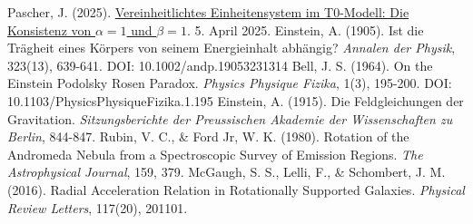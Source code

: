 \documentclass[12pt,a4paper]{article}
\begin{document}
\begin{thebibliography}{99}
		 Pascher, J. (2025). \href{https://github.com/jpascher/T0-Time-Mass-Duality/tree/main/2/pdf/Deutsch/Die Konsistenz von alpha = 1 und beta = 1.pdf}{Vereinheitlichtes Einheitensystem im T0-Modell: Die Konsistenz von \(\alpha = 1\) und \(\beta = 1\)}. 5. April 2025.
		 Einstein, A. (1905). Ist die Trägheit eines Körpers von seinem Energieinhalt abhängig? \textit{Annalen der Physik}, 323(13), 639-641. DOI: 10.1002/andp.19053231314
		 Bell, J. S. (1964). On the Einstein Podolsky Rosen Paradox. \textit{Physics Physique Fizika}, 1(3), 195-200. DOI: 10.1103/PhysicsPhysiqueFizika.1.195
		 Einstein, A. (1915). Die Feldgleichungen der Gravitation. \textit{Sitzungsberichte der Preussischen Akademie der Wissenschaften zu Berlin}, 844-847.
		 Rubin, V. C., \& Ford Jr, W. K. (1980). Rotation of the Andromeda Nebula from a Spectroscopic Survey of Emission Regions. \textit{The Astrophysical Journal}, 159, 379.
		 McGaugh, S. S., Lelli, F., \& Schombert, J. M. (2016). Radial Acceleration Relation in Rotationally Supported Galaxies. \textit{Physical Review Letters}, 117(20), 201101.
	\end{thebibliography}
	
\end{document}
